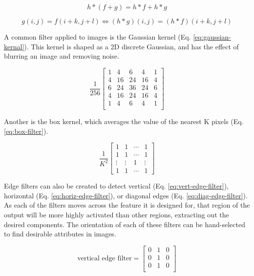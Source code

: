 \begin{equation}
    h *(f + g) = h*f + h*g
    \label{eq:superposition}
\end{equation}

\begin{equation}
    g(i,j) = f(i+k,j+l) \Longleftrightarrow (h*g)(i,j) = (h*f)(i+k,j+l)
    \label{eq:shift-invariance}
\end{equation}

A common filter applied to images is the Gaussian kernel (Eq. \ref{eq:gaussian-kernal}). This kernel is shaped as a 2D discrete Gaussian, and has the effect of blurring an image and removing noise.

\begin{equation}
    \frac{1}{256}\begin{bmatrix}
        1 & 4 & 6 & 4 & 1 \\
        4 & 16 & 24 & 16 & 4\\
        6 & 24 & 36 & 24 & 6\\
        4 & 16 & 24 & 16 & 4\\
        1 & 4 & 6 & 4 & 1 \\
    \end{bmatrix}
    \label{eq:gaussian-kernal}
\end{equation}

Another is the box kernel, which averages the value of the nearest K pixels (Eq. \ref{eq:box-filter}).

\begin{equation}
    \frac{1}{K^{2}}\begin{bmatrix}
        1 & 1 & \cdots &1\\
        1 & 1 & \cdots &1 \\
        \vdots & \vdots & 1 & \vdots \\
        1 & 1 & \cdots & 1
    \end{bmatrix}
    \label{eq:box-filter}
\end{equation}

Edge filters can also be created to detect vertical (Eq. \ref{eq:vert-edge-filter}), horizontal (Eq. \ref{eq:horiz-edge-filter}), or diagonal edges (Eq. \ref{eq:diag-edge-filter}). As each of the filters moves across the feature it is designed for, that region of the output will be more highly activated than other regions, extracting out the desired components. The orientation of each of these filters can be hand-selected to find desirable attributes in images.

\begin{equation}
    \text{vertical edge filter} = \begin{bmatrix}
            0 & 1 & 0 \\
            0 & 1 & 0 \\
            0 & 1 & 0 \\
    \end{bmatrix}
    \label{eq:vert-edge-filter}
\end{equation}

